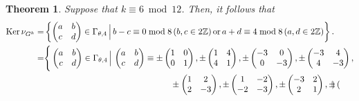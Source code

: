 \documentclass[12pt]{article}
\theoremstyle{definition}
\newtheorem{theorem}{Theorem}
\numberwithin{equation}{section}
\numberwithin{theorem}{section}
\newcommand{\Ker}{\operatorname{Ker}}
\begin{document}
\begin{theorem}
\label{thmk=6-level4}
{\it
Suppose that 
$k\equiv 6 \bmod{12}$. 
Then, it follows that 
\begin{align*}
\Ker \nu_{G^{k}}
=&
\left\{
\begin{pmatrix}
a & b \\
c & d
\end{pmatrix}
\in
\Gamma_{\theta,4} \,\Big| \, 
b-c\equiv 0 \bmod{8} \, (b, c\in2 \mathbb{Z}) \,\mathrm{or} \,
a+d\equiv 4 \bmod{8}  \, (a,d\in2\mathbb{Z}) 
\right\}.  \\
=&
\Bigg\{
\begin{pmatrix}
a & b \\
c & d
\end{pmatrix}
\in
\Gamma_{\theta,4} \,\Big| \, 
\begin{pmatrix}
a & b \\
c & d
\end{pmatrix}
\equiv
\pm
\begin{pmatrix}
1 & 0 \\
0 & 1
\end{pmatrix}, 
\pm
\begin{pmatrix}
1 & 4 \\
4 & 1
\end{pmatrix}, 
\pm
\begin{pmatrix}
-3 & 0 \\
0 & -3
\end{pmatrix}, 
\pm
\begin{pmatrix}
-3 & 4 \\
4 & -3
\end{pmatrix},  \\
&\hspace{52mm}
\pm
\begin{pmatrix}
1 & 2 \\
2 & -3
\end{pmatrix}, 
\pm
\begin{pmatrix}
1 & -2 \\
-2 & -3
\end{pmatrix}, 
\pm
\begin{pmatrix}
-3 & 2 \\
2 & 1
\end{pmatrix}, 
\pm
\begin{pmatrix}

\end{pmatrix}
\end{align*}}
\end{theorem}
\end{document}
